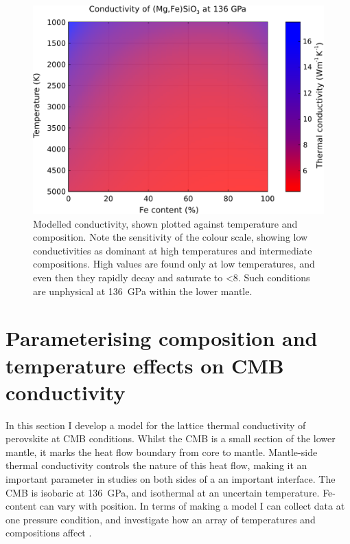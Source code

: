 \begin{figure}[h!]
  \includegraphics[width=\linewidth]{Figures/K_over_T_over_X.png}
  \caption[CONTENTS BIT]{Modelled conductivity, shown plotted against temperature and composition. Note the sensitivity of the colour scale, showing low conductivities as dominant at high temperatures and intermediate compositions. High values are found only at low temperatures, and even then they rapidly decay and saturate to <8\wmk. Such conditions are unphysical at 136~GPa within the lower mantle.}
  \label{fig:kappa-temp-comp_01}
\end{figure}



\section{Parameterising composition and temperature effects on CMB conductivity}

In this section I develop a model for the lattice thermal conductivity of \mgfesios perovskite at CMB conditions. Whilst the CMB is a small section of the lower mantle, it marks the heat flow boundary from core to mantle. Mantle-side thermal conductivity controls the nature of this heat flow, making it an important parameter in studies on both sides of a an important interface. The CMB is isobaric at 136~GPa, and isothermal at an uncertain temperature. Fe-content can vary with position. In terms of making a model I can collect data at one pressure condition, and investigate how an array of temperatures and compositions affect \tc.

